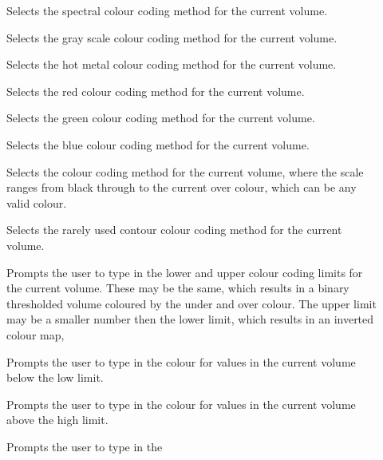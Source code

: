\begin{description}
\item[]  Selects the spectral colour coding
                                          method for the current volume.
\item[]  Selects the gray scale colour coding
                                          method for the current volume.
\item[]  Selects the hot metal colour coding
                                          method for the current volume.
\item[]  Selects the red colour coding
                                     method for the current volume.
\item[]  Selects the green colour coding
                                       method for the current volume.
\item[]  Selects the blue colour coding
                                      method for the current volume.
\item[]  Selects the
                 colour coding method for the current volume, where the scale
                 ranges from black through to the current over colour, which
                 can be any valid colour.
\item[]  Selects the rarely used contour
                                    colour coding method for the current volume.
\item[]  Prompts the user to type in the lower
                        and upper colour coding limits for the current volume.
                      These may be the same, which results in a binary
                      thresholded volume coloured by the under and over colour.
                      The upper limit may be a smaller number then the lower
                      limit, which results in an inverted colour map,
\item[]  Prompts the user to type in
               the colour for values in the current volume below the low limit.
\item[]  Prompts the user to type in
               the colour for values in the current volume above the high limit.
\item[]  Prompts the user to type in the

\end{description}
